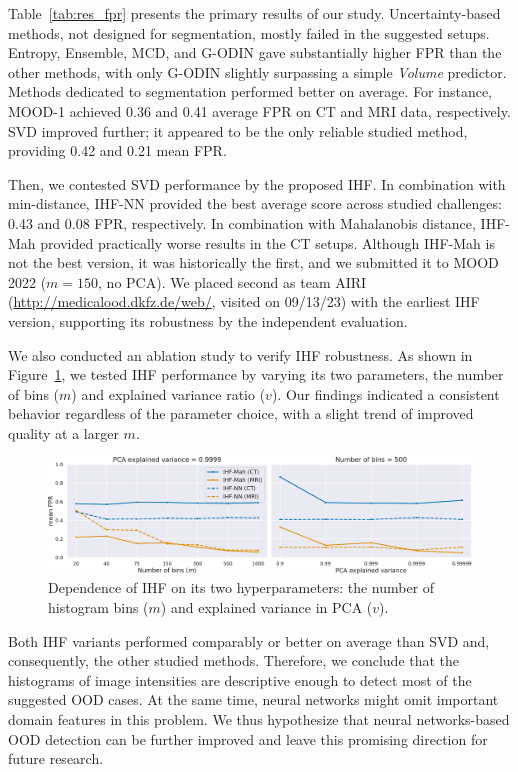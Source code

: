 Table~\ref{tab:res_fpr} presents the primary results of our study. Uncertainty-based methods, not designed for segmentation, mostly failed in the suggested setups. Entropy, Ensemble, MCD, and G-ODIN gave substantially higher FPR than the other methods, with only G-ODIN slightly surpassing a simple \textit{Volume} predictor. Methods dedicated to segmentation performed better on average. For instance, MOOD-1 achieved 0.36 and 0.41 average FPR on CT and MRI data, respectively. SVD improved further; it appeared to be the only reliable studied method, providing 0.42 and 0.21 mean FPR.



Then, we contested SVD performance by the proposed IHF. In combination with min-distance, IHF-NN provided the best average score across studied challenges: 0.43 and 0.08 FPR, respectively. In combination with Mahalanobis distance, IHF-Mah provided practically worse results in the CT setups. Although IHF-Mah is not the best version, it was historically the first, and we submitted it to MOOD 2022 ($m=150$, no PCA). We placed second as team AIRI (\url{http://medicalood.dkfz.de/web/}, visited on 09/13/23) with the earliest IHF version, supporting its robustness by the independent evaluation.

We also conducted an ablation study to verify IHF robustness. As shown in Figure~\ref{fig:ihf_hyp}, we tested IHF performance by varying its two parameters, the number of bins ($m$) and explained variance ratio ($v$). Our findings indicated a consistent behavior regardless of the parameter choice, with a slight trend of improved quality at a larger $m$.

\begin{figure}[h]
	\centering
	\includegraphics[width=\textwidth]{Dissertation/Figures/5_ood_bench/ihf_hyp.pdf}
	\caption{Dependence of IHF on its two hyperparameters: the number of histogram bins ($m$) and explained variance in PCA ($v$).}%
	\label{fig:ihf_hyp}
\end{figure}

Both IHF variants performed comparably or better on average than SVD and, consequently, the other studied methods. Therefore, we conclude that the histograms of image intensities are descriptive enough to detect most of the suggested OOD cases. At the same time, neural networks might omit important domain features in this problem. We thus hypothesize that neural networks-based OOD detection can be further improved and leave this promising direction for future research.

